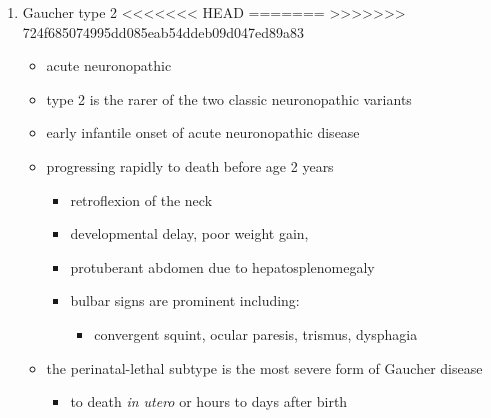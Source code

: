 \documentclass[fontsize=12pt]{scrartcl}
\begin{document}
\begin{enumerate}
\begin{enumerate}
\begin{enumerate}
\begin{enumerate}
\begin{table}[htbp]
\begin{enumerate}
\begin{enumerate}
\begin{table}[htbp]
\begin{enumerate}
\item Gaucher type 2
<<<<<<< HEAD
\label{sec:orgc010642}
=======
\label{sec:orgdfbd6a5}
>>>>>>> 724f685074995dd085eab54ddeb09d047ed89a83
\begin{itemize}
\item acute neuronopathic
\item type 2 is the rarer of the two classic neuronopathic variants
\item early infantile onset of acute neuronopathic disease
\item progressing rapidly to death before age 2 years
\begin{itemize}
\item retroflexion of the neck
\item developmental delay, poor weight gain,
\item protuberant abdomen due to hepatosplenomegaly
\item bulbar signs are prominent including:
\begin{itemize}
\item convergent squint, ocular paresis, trismus, dysphagia
\end{itemize}
\end{itemize}
\item the perinatal-lethal subtype is the most severe form of Gaucher
disease
\begin{itemize}
\item to death \emph{in utero} or hours to days after birth
\end{itemize}
\end{itemize}


\end{enumerate}
\end{table}
\end{enumerate}
\end{enumerate}
\end{table}
\end{enumerate}
\end{enumerate}
\end{enumerate}
\end{enumerate}
\end{document}

